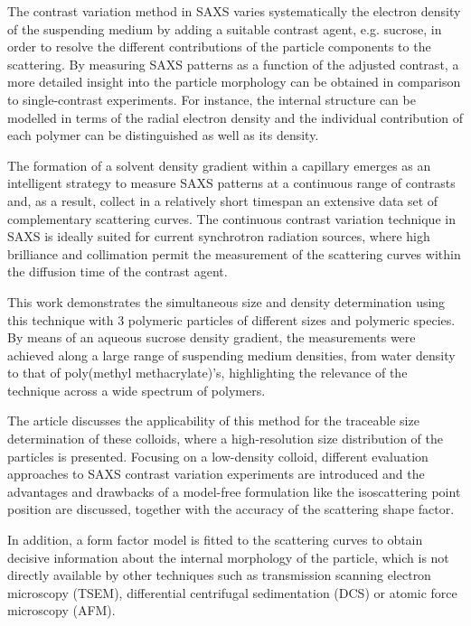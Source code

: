 The contrast variation method in SAXS varies systematically the electron density of the suspending medium by adding a suitable contrast agent, e.g. sucrose, in order to resolve the different contributions of the particle components to the scattering. By measuring SAXS patterns as a function of the adjusted contrast, a more detailed insight into the particle morphology can be obtained in comparison to single-contrast experiments\citep{bolze_situ_2004}. For instance, the internal structure can be modelled in terms of the radial electron density\citep{dingenouts_radial_1994,dingenouts_analysis_1999,ballauff_analysis_2011,ballauff_smallangle_1996} and the individual contribution of each polymer can be distinguished\citep{beyer_saxs_1990,grunder_analysis_1991,grunder_smallangle_1993,ottewill_characterization_1995,bolze_smallangle_1997,dingenouts_structure_1994} as well as its density\citep{mykhaylyk_application_2007-1}.

The formation of a solvent density gradient within a capillary emerges as an intelligent strategy to measure SAXS patterns at a continuous range of contrasts and, as a result, collect in a relatively short timespan an extensive data set of complementary scattering curves\citep{garcia-diez_nanoparticle_2015}. The continuous contrast variation technique in SAXS is ideally suited for current synchrotron radiation sources, where high brilliance and collimation permit the measurement of the scattering curves within the diffusion time of the contrast agent.

This work demonstrates the simultaneous size and density determination using this technique with 3 polymeric particles of different sizes and polymeric species. By means of an aqueous sucrose density gradient, the measurements were achieved along a large range of suspending medium densities, from water density to that of poly(methyl methacrylate)'s, highlighting the relevance of the technique across a wide spectrum of polymers.

The article discusses the applicability of this method for the traceable size determination of these colloids, where a high-resolution size distribution of the particles is presented. Focusing on a low-density colloid, different evaluation approaches to SAXS contrast variation experiments are introduced and the advantages and drawbacks of a model-free formulation like the isoscattering point position are discussed, together with the accuracy of the scattering shape factor.

In addition, a form factor model is fitted to the scattering curves to obtain decisive information about the internal morphology of the particle, which is not directly available by other techniques such as transmission scanning electron microscopy (TSEM), differential centrifugal sedimentation (DCS)\citep{fielding_correcting_2012} or atomic force microscopy (AFM). 

